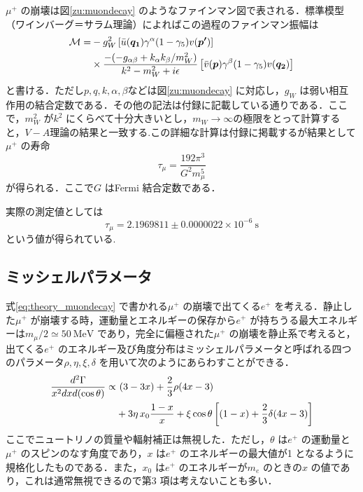 $\mu^{+}$ の崩壊は図\ref{zu:muondecay} のようなファインマン図で表される．標準模型（ワインバーグ＝サラム理論）によればこの過程のファインマン振幅は
\begin{align}
\mathcal{M} = &-g_{W}^2\left[\Bar{u}(\bm{q_{1}})\gamma^{\alpha}(1 - \gamma_{5})v(\bm{p'})\right] \notag \\ 
&\times \frac{-(-g_{\alpha\beta} + k_{\alpha}k_{\beta}/m_{W}^2)}{k^{2} - m_{W}^2 + i\epsilon}\left[\Bar{v}(\bm{p})\gamma^{\beta}(1 - \gamma_5)v(\bm{q_{2}})\right]
\label{eq:theory_muondecayamp}
\end{align}%
と書ける．ただし$p, q, k, \alpha, \beta$などは図\ref{zu:muondecay} に対応し，$g_{W}$ は弱い相互作用の結合定数である．その他の記法は付録に記載している通りである．ここで，$m_{W}^2$ が$k^2$ にくらべて十分大きいとし，$m_{W} \rightarrow \infty$の極限をとって計算すると，$V-A$理論の結果と一致する.この詳細な計算は付録に掲載するが結果として$\mu^+$ の寿命
\begin{equation}
\tau_{\mu} = \frac{192\pi^3}{G^{2} m_{\mu}^{5}}
\label{eq:thory_muonlifetime}
\end{equation}
が得られる．ここで$G$ はFermi 結合定数である．

実際の測定値としては
\[\tau_{\mu} = 2.1969811 \pm 0.0000022 \times 10^{-6}~\mathrm{s}\]
という値が得られている\cite{PDG}.
	
\subsection{ミッシェルパラメータ}
式\eqref{eq:theory_muondecay} で書かれる$\mu^{+}$ の崩壊で出てくる$e^{+}$ を考える．静止した$\mu^{+}$ が崩壊する時，運動量とエネルギーの保存から$e^{+}$ が持ちうる最大エネルギーは$m_{\mu}/2 \simeq 50~\mathrm{MeV}$ であり，完全に偏極された$\mu^{+}$ の崩壊を静止系で考えると，出てくる$e^{+}$ のエネルギー及び角度分布はミッシェルパラメータと呼ばれる四つのパラメータ$\rho, \eta, \xi, \delta$ を用いて次のようにあらわすことができる\cite{michel_parameter}．
\begin{align}
\frac{d^2\Gamma}{x^{2}dxd(\cos \theta)} \propto& \,\,(3 - 3x) + \frac{2}{3}\rho (4x - 3) \notag \\
&+ 3 \eta \,x_{0} \frac{1-x}{x} + \xi \cos \theta \left[(1 - x) + \frac{2}{3} \delta (4x - 3)\right]
\label{eq:theory_michel}
\end{align}
ここでニュートリノの質量や輻射補正は無視した．ただし，$\theta$ は$e^{+}$ の運動量と$\mu^{+}$ のスピンのなす角度であり，$x$ は$e^{+}$ のエネルギーの最大値が1 となるように規格化したものである．また，$x_0$ は$e^{+}$ のエネルギーが$m_{e}$ のときの$x$ の値であり，これは通常無視できるので第3 項は考えないことも多い．


